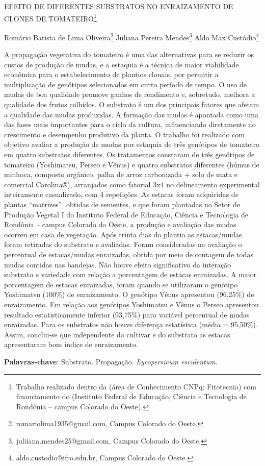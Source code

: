 \documentclass[article,12pt,onesidea,4paper,english,brazil]{abntex2}
\begin{document}
	
	
	\frenchspacing 
	
	\begin{center}
		\LARGE EFEITO DE DIFERENTES SUBSTRATOS NO ENRAIZAMENTO DE CLONES DE TOMATEIRO\footnote{Trabalho realizado dentro da (área de Conhecimento CNPq: Fitotecnia) com financiamento do (Instituto Federal de Educação, Ciência e Tecnologia de Rondônia – campus Colorado do Oeste).}
		
		\normalsize
		Romário Batista de Lima Oliveira\footnote{romariolima1935@gmail.com, Campus Colorado do Oeste.} 
	Juliana Pereira Mendes\footnote{juliiana.mendes25@gmail.com, Campus Colorado do Oeste.} 
	Aldo Max Custódio\footnote{aldo.custodio@ifro.edu.br, Campus Colorado do Oeste.} 
	
	\end{center}
	
	\noindent A propagação vegetativa do tomateiro é uma das alternativas para se reduzir os custos de produção de mudas, e a estaquia é a técnica de maior viabilidade econômica para o estabelecimento de plantios clonais, por permitir a multiplicação de genótipos selecionados em curto período de tempo. O uso de mudas de boa qualidade promove ganhos de rendimento e, sobretudo, melhora a qualidade dos frutos colhidos. O substrato é um dos principais fatores que afetam a qualidade das mudas produzidas. A formação das mudas é apontada como uma das fases mais importantes para o ciclo da cultura, influenciando diretamente no crescimento e desempenho produtivo da planta. O trabalho foi realizado com objetivo avaliar a produção de mudas por estaquia de três genótipos de tomateiro em quatro substratos diferentes. Os tratamentos constaram de três genótipos de tomateiro (Yoshimatsu, Perseo e Vênus) e quatro substratos diferentes (húmus de minhoca, composto orgânico, palha de arroz carbonizada + solo de mata e comercial Carolina®), arranjados como fatorial 3x4 no delineamento experimental inteiramente casualizado, com 4 repetições. As estacas foram adquiridas de plantas “matrizes”, obtidas de sementes, e que foram plantadas no Setor de Produção Vegetal I do Instituto Federal de Educação, Ciência e Tecnologia de Rondônia – campus Colorado do Oeste, a produção e avaliação das mudas ocorreu em casa de vegetação. Após trinta dias do plantio as estacas/mudas foram retiradas do substrato e avaliadas. Foram consideradas na avaliação o percentual de estacas/mudas enraizadas, obtida por meio de contagem de todas mudas contidas nas bandejas. Não houve efeito significativo da interação substrato e variedade com relação a porcentagem de estacas enraizadas. A maior porcentagem de estacas enraizadas, foram quando se utilizaram o genótipo Yoshimatsu (100\%) de enraizamento. O genótipo Vênus apresentou (96,25\%) de enraizamento. Em relação aos genótipos Yoshimatsu e Vênus o Perseo apresentou resultado estatisticamente inferior (93,75\%) para variável percentual de mudas enraizadas. Para os substratos não houve diferença estatística (média = 95,50\%). Assim, conclui-se que independente da cultivar e do substrato as estacas apresentaram bom índice de enraizamento.
	
	\vspace{\onelineskip}
	
	\noindent
	\textbf{Palavras-chave}: Substrato. Propagação. \textit{Lycopersicum esculentum}.
	
\end{document}
